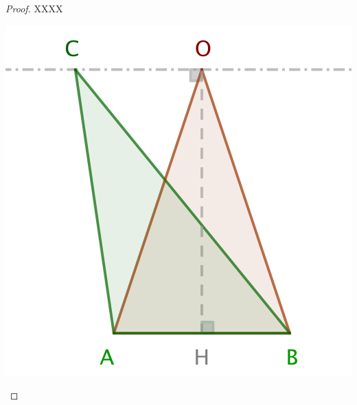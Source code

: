 \begin{proof}
	XXXX

	\begin{center}
		\includegraphics[scale=.4]{content/triangle/triangle.png}
	\end{center}


\end{proof}
